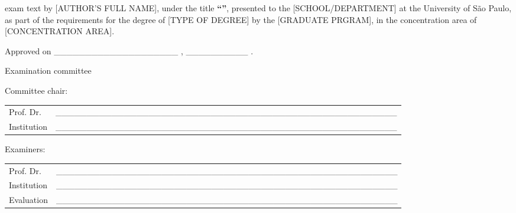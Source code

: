 \begin{folhadeaprovacao}
 exam text by [AUTHOR'S FULL NAME], under the title \textbf{``\imprimirtitulo''}, presented to the [SCHOOL/DEPARTMENT] at the University of São Paulo, as part of the requirements for the degree of [TYPE OF DEGREE] by the [GRADUATE PRGRAM], in the concentration area of [CONCENTRATION AREA].


\vspace*{1.5cm}

\noindent
Approved on \_\_\_\_\_\_\_\_\_\_\_\_\_\_\_\_\_\_\_\_ , \_\_\_\_\_\_\_\_\_\_ .

\vspace*{1.5cm}

\begin{center}
\noindent Examination committee
\end{center}

\vspace*{0.5cm}

\noindent Committee chair:

\vspace*{0.25cm}

\renewcommand{\arraystretch}{2}
\setlength{\arrayrulewidth}{0pt}
\setlength{\tabcolsep}{0pt}
\noindent
\begin{tabular}{m{2cm} P{14cm}}
  Prof. Dr. & \_\_\_\_\_\_\_\_\_\_\_\_\_\_\_\_\_\_\_\_\_\_\_\_\_\_\_\_\_\_\_\_\_\_\_\_\_\_\_\_\_\_\_\_\_\_\_\_\_\_\_\_\_\_\_ \\
  Institution & \_\_\_\_\_\_\_\_\_\_\_\_\_\_\_\_\_\_\_\_\_\_\_\_\_\_\_\_\_\_\_\_\_\_\_\_\_\_\_\_\_\_\_\_\_\_\_\_\_\_\_\_\_\_\_ \\
\end{tabular}

\vspace*{1cm}

\noindent Examiners:

\vspace*{0.25cm}

\noindent
\begin{tabular}{m{2cm} P{14cm}}
  Prof. Dr. & \_\_\_\_\_\_\_\_\_\_\_\_\_\_\_\_\_\_\_\_\_\_\_\_\_\_\_\_\_\_\_\_\_\_\_\_\_\_\_\_\_\_\_\_\_\_\_\_\_\_\_\_\_\_\_ \\
  Institution & \_\_\_\_\_\_\_\_\_\_\_\_\_\_\_\_\_\_\_\_\_\_\_\_\_\_\_\_\_\_\_\_\_\_\_\_\_\_\_\_\_\_\_\_\_\_\_\_\_\_\_\_\_\_\_ \\
  Evaluation & \_\_\_\_\_\_\_\_\_\_\_\_\_\_\_\_\_\_\_\_\_\_\_\_\_\_\_\_\_\_\_\_\_\_\_\_\_\_\_\_\_\_\_\_\_\_\_\_\_\_\_\_\_\_\_ \\
\end{tabular}


\end{folhadeaprovacao}
